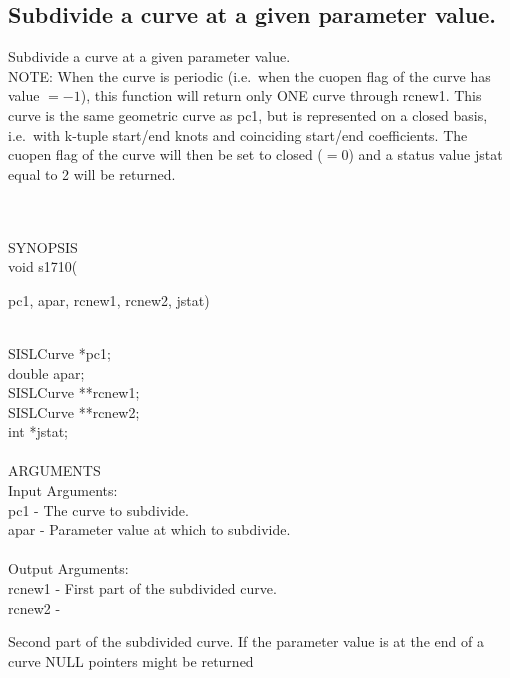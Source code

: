 \subsection{Subdivide a curve at a given parameter value.}
\begin{minipg1}
  Subdivide a curve at a given parameter value.\\
  NOTE: When the curve is periodic (i.e.\ when the {\fov cuopen} flag of
  the curve has value $=-1$), this function will return only ONE curve
  through {\fov rcnew1}. This curve is the same geometric curve as {\fov pc1},
  but is represented on a closed basis, i.e.\ with k-tuple start/end
  knots and coinciding start/end coefficients.
  The {\fov cuopen} flag of the curve will then be set to closed ($=0$)
  and a status value {\fov jstat} equal to 2 will be returned.
\end{minipg1} \\ \\
SYNOPSIS\\
        \>void s1710(\begin{minipg3}
          {\fov pc1},  {\fov apar},  {\fov rcnew1},  {\fov rcnew2},  {\fov jstat})
        \end{minipg3}\\[0.3ex]
        \>\>    SISLCurve \> *{\fov pc1};\\
        \>\>    double    \> {\fov apar};\\
        \>\>    SISLCurve \> **{\fov rcnew1};\\
        \>\>    SISLCurve \> **{\fov rcnew2};\\
        \>\>    int       \> *{\fov jstat};\\
\\
ARGUMENTS\\
        \>Input Arguments:\\
        \>\>    {\fov pc1}  \> - \> The curve to subdivide.\\
        \>\>    {\fov apar} \> - \> Parameter value at which to subdivide.\\
\\
        \>Output Arguments:\\
        \>\>    {\fov rcnew1} \> - \> First part of the subdivided curve.\\
        \>\>    {\fov rcnew2} \> - \>
        \begin{minipg2}
          Second part of the subdivided curve.
          If the parameter value is at the end of a
          curve NULL pointers might be returned
        \end{minipg2}\\[0.8ex]
